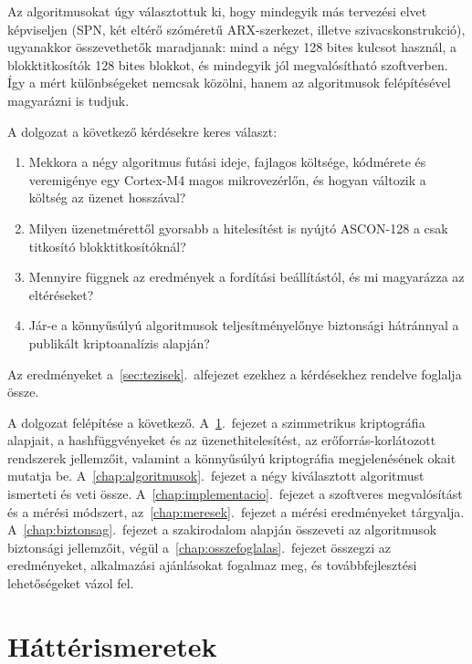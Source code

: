 \documentclass[a4paper,12pt]{report}
\theoremstyle{definition}
\theoremstyle{remark}
\begin{document}
Az algoritmusokat úgy választottuk ki, hogy mindegyik más tervezési elvet képviseljen (SPN, két eltérő szóméretű ARX-szerkezet, illetve szivacskonstrukció), ugyanakkor összevethetők maradjanak: mind a négy 128 bites kulcsot használ, a blokktitkosítók 128 bites blokkot, és mindegyik jól megvalósítható szoftverben. Így a mért különbségeket nemcsak közölni, hanem az algoritmusok felépítésével magyarázni is tudjuk.

A dolgozat a következő kérdésekre keres választ:
\begin{enumerate}
	\item[K1.] Mekkora a négy algoritmus futási ideje, fajlagos költsége, kódmérete és veremigénye egy Cortex-M4 magos mikrovezérlőn, és hogyan változik a költség az üzenet hosszával?
	\item[K2.] Milyen üzenetmérettől gyorsabb a hitelesítést is nyújtó ASCON-128 a csak titkosító blokktitkosítóknál?
	\item[K3.] Mennyire függnek az eredmények a fordítási beállítástól, és mi magyarázza az eltéréseket?
	\item[K4.] Jár-e a könnyűsúlyú algoritmusok teljesítményelőnye biztonsági hátránnyal a publikált kriptoanalízis alapján?
\end{enumerate}
Az eredményeket a~\ref{sec:tezisek}.~alfejezet ezekhez a kérdésekhez rendelve foglalja össze.

A dolgozat felépítése a következő. A~\ref{chap:hatter}.~fejezet a szimmetrikus kriptográfia alapjait, a hashfüggvényeket és az üzenethitelesítést, az erőforrás-korlátozott rendszerek jellemzőit, valamint a könnyűsúlyú kriptográfia megjelenésének okait mutatja be. A~\ref{chap:algoritmusok}.~fejezet a négy kiválasztott algoritmust ismerteti és veti össze. A~\ref{chap:implementacio}.~fejezet a szoftveres megvalósítást és a mérési módszert, az~\ref{chap:meresek}.~fejezet a mérési eredményeket tárgyalja. A~\ref{chap:biztonsag}.~fejezet a szakirodalom alapján összeveti az algoritmusok biztonsági jellemzőit, végül a~\ref{chap:osszefoglalas}.~fejezet összegzi az eredményeket, alkalmazási ajánlásokat fogalmaz meg, és továbbfejlesztési lehetőségeket vázol fel.

\chapter{Háttérismeretek}\label{chap:hatter}
\end{document}
